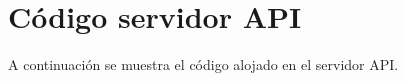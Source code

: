 \chapter{Código servidor API}
\label{cap:Codigo servidor API}

A continuación se muestra el código alojado en el servidor API.

